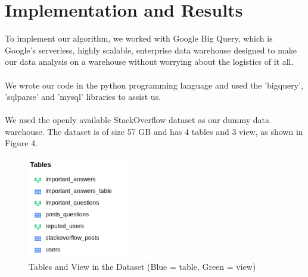 \documentclass[12pt]{report}
\begin{document}
\section{Implementation and Results}
To implement our algorithm, we worked with Google Big Query, which is Google's serverless, highly scalable, enterprise data warehouse designed to make our data analysis on a warehouse without worrying about the logistics of it all. \cite{gcp} 
\\\\ We wrote our code in the python programming language and used the 'bigquery', 'sqlparse' and 'mysql' libraries to assist us.
\\\\We used the openly available StackOverflow dataset as our dummy data warehouse. The dataset is of size 57 GB and has 4 tables and 3 view, as shown in Figure 4.
\begin{figure}[H]
\centering \includegraphics[width=0.4\textwidth]{images/so.png}
\caption{Tables and View in the Dataset (Blue = table, Green = view)}
\end{figure}
\end{document}
